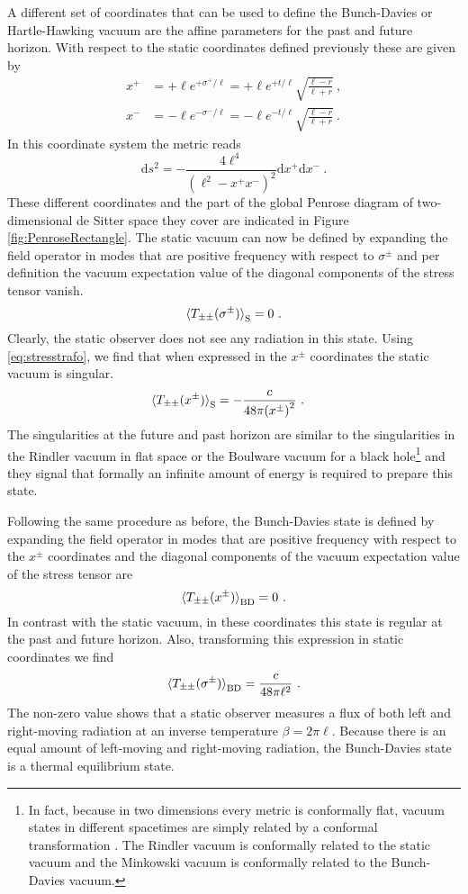 \documentclass[a4paper,11pt]{article}
\newcommand{\beq}{\begin{equation}}
\newcommand{\eeq}{\end{equation}}
\newcommand{\bal}{\begin{aligned}}
\newcommand{\eal}{\end{aligned}}
\newcommand{\rmd}{\mathrm{d}}
\numberwithin{equation}{section}
\begin{document}
A different set of coordinates that can be used to define the Bunch-Davies or Hartle-Hawking vacuum are the affine parameters for the past and future horizon. With respect to the static coordinates defined previously these are given by
\beq \label{eq:KruskalMetric}
\bal
x^+ &= +\ell e^{+\sigma^+/\ell} = +\ell e^{+t/\ell}\sqrt{\frac{\ell-r}{\ell+r}} ~,\\
x^- &= -\ell e^{-\sigma^-/\ell} = -\ell e^{-t/\ell}\sqrt{\frac{\ell-r}{\ell+r}} ~.
\eal
\eeq
In this coordinate system the metric reads
\beq
\rmd s^2 = -\frac{4\ell^4}{(\ell^2-x^+x^-)^2}\rmd x^+\rmd x^- ~.
\eeq
These different coordinates and the part of the global Penrose diagram of two-dimensional de Sitter space they cover are indicated in Figure \ref{fig:PenroseRectangle}.
The static vacuum can now be defined by expanding the field operator in modes that are positive frequency with respect to $\sigma^\pm$ and per definition the vacuum expectation value of the diagonal components of the stress tensor vanish.
\beq
\braket{T_{\pm\pm}(\sigma^\pm)}_{\rm S} = 0 ~.
\eeq
Clearly, the static observer does not see any radiation in this state. Using \eqref{eq:stresstrafo}, we find that when expressed in the $x^\pm$ coordinates the static vacuum is singular.
\beq
\bal
\braket{T_{\pm\pm}(x^\pm)}_{\rm S} &= -\frac{c}{48\pi {(x^\pm)}^2} ~.
\eal
\eeq
The singularities at the future and past horizon are similar to the singularities in the Rindler vacuum in flat space or the Boulware vacuum for a black hole\footnote{In fact, because in two dimensions every metric is conformally flat, vacuum states in different spacetimes are simply related by a conformal transformation \cite{Candelas:1978gf}. The Rindler vacuum is conformally related to the static vacuum and the Minkowski vacuum is conformally related to the Bunch-Davies vacuum.} and they signal that formally an infinite amount of energy is required to prepare this state.

Following the same procedure as before, the Bunch-Davies state is defined by expanding the field operator in modes that are positive frequency with respect to the $x^\pm$ coordinates and the diagonal components of the vacuum expectation value of the stress tensor are
\beq
\braket{T_{\pm\pm}(x^\pm)}_{\rm BD} = 0 ~.
\eeq
In contrast with the static vacuum, in these coordinates this state is regular at the past and future horizon. Also, transforming this expression in static coordinates we find
\beq
\braket{T_{\pm\pm}(\sigma^\pm)}_{\rm BD} = \frac{c}{48\pi \ell^2} ~.
\eeq
The non-zero value shows that a static observer measures a flux of both left and right-moving radiation at an inverse temperature $\beta=2\pi\ell$. Because there is an equal amount of left-moving and right-moving radiation, the Bunch-Davies state is a thermal equilibrium state.
\end{document}
